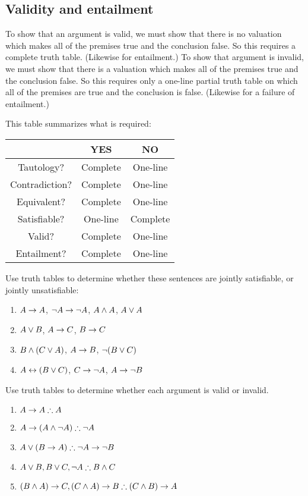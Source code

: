 \subsection{Validity and entailment}

To show that an argument is valid, we must show that there is no valuation which makes all of the premises true and the conclusion false. So this requires a complete truth table. (Likewise for entailment.) To show that argument is invalid, we must show that there is a valuation which makes all of the premises true and the conclusion false. So this requires only a one-line partial truth table on which all of the premises are true and the conclusion is false. (Likewise for a failure of entailment.)

This table summarizes what is required:
\begin{center}
\begin{tabular}{c|c|c}
&YES&NO\\
\hline
Tautology?&Complete&One-line\\
Contradiction?&Complete&One-line\\
Equivalent?&Complete&One-line\\
Satisfiable?&One-line&Complete\\
Valid?&Complete&One-line\\
Entailment?&Complete&One-line\\
\end{tabular}
\end{center}

\practiceproblems
\problempart
\label{pr.TT.satisfiable}
Use truth tables to determine whether these sentences are jointly satisfiable, or jointly unsatisfiable:
\begin{enumerate}
\item $A\rightarrow A$, $\neg A \rightarrow \neg A$, $A\wedge A$, $A\vee A$ %
\item $A\vee B$, $A\rightarrow C$, $B\rightarrow C$ %
\item $B\wedge(C\vee A)$, $A\rightarrow B$, $\neg(B\vee C)$  %
\item $A\leftrightarrow(B\vee C)$, $C\rightarrow \neg A$, $A\rightarrow \neg B$ %
\end{enumerate}


\solutions
\problempart
\label{pr.TT.valid}
Use truth tables to determine whether each argument is valid or invalid.
\begin{enumerate}
\item $A\eif A \therefore A$ %
\item $A\eif(A\eand\enot A) \therefore \enot A$ %
\item $A\eor(B\eif A) \therefore \enot A \eif \enot B$ %
\item $A\eor B, B\eor C, \enot A \therefore B \eand C$ %
\item $(B\eand A)\eif C, (C\eand A)\eif B \therefore (C\eand B)\eif A$ %
\end{enumerate}

